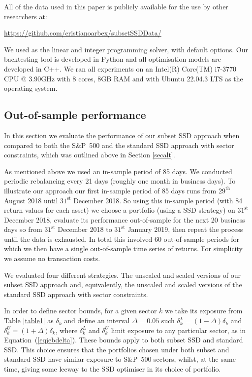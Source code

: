 All of the data used in this paper is publicly available for the use by other researchers at:
\begin{center}
\url{https://github.com/cristianoarbex/subsetSSDData/}
\end{center}

We used \cite{cplex} as the
linear and integer programming solver, with default options. Our backtesting tool is developed in Python and all optimisation models are developed in C++. We ran all experiments on an Intel(R) Core(TM) i7-3770 CPU @ 3.90GHz with 8 cores, 8GB RAM and with Ubuntu 22.04.3 LTS as the operating system.

\subsection{Out-of-sample performance}

In this section we evaluate the performance of our subset SSD 
approach when compared to both the S\&P~500 and the standard SSD approach with sector constraints, which was outlined above in Section \ref{secalt}.

As mentioned above we used an in-sample period of 85 days. 
We conducted  periodic rebalancing every 21 days (roughly one month in business days). 
To illustrate our approach  our first in-sample period of 85 days runs from $29^{\text{th}}$ August 2018 until $31^{\text{st}}$ December 2018.
So using this in-sample period (with 84 return values for each asset) we choose a portfolio (using a SSD strategy) 
on  $31^{\text{st}}$ December 2018, evaluate its performance out-of-sample for the next 20 business days so from $31^{\text{st}}$ December 2018 to $31^{\text{st}}$ January 2019, then repeat the process until the data is exhausted. In total this involved 60 out-of-sample periods for which we then have a single out-of-sample time series of returns. For simplicity we assume no transaction costs.


We evaluated four different strategies. The unscaled and scaled versions of our subset SSD approach and, equivalently, the unscaled and scaled versions of the standard SSD approach with sector constraints. 

In order to define sector bounds, for a given sector $k$ we take its exposure from Table \ref{table1} as $\delta_k$ and define an interval $\Delta = 0.05$ such $\delta_k^L = (1 - \Delta) \delta_k $ and $\delta_k^U = (1 + \Delta) \delta_k$, where
$\delta_k^L$ and $\delta_k^U$ limit exposure to any particular sector, as in Equation~(\ref{eqjebdelta}).
These bounds apply to both subset SSD and standard SSD. This choice ensures that the portfolios chosen under both subset and standard SSD
have similar exposure to S\&P~500 sectors, whilst, at the same time, giving some leeway to the SSD optimiser in its choice of portfolio.

